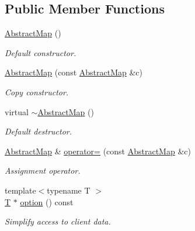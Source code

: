 \subsection*{Public Member Functions}
\begin{DoxyCompactItemize}
\item 
\hyperlink{class_d_d4hep_1_1_conditions_1_1_abstract_map_a8642c9a5024d3390bd2cb8e3c889073a}{AbstractMap} ()
\begin{DoxyCompactList}\small\item\em Default constructor. \item\end{DoxyCompactList}\item 
\hyperlink{class_d_d4hep_1_1_conditions_1_1_abstract_map_a0792cc7e113b71a15f238b363b95816d}{AbstractMap} (const \hyperlink{class_d_d4hep_1_1_conditions_1_1_abstract_map}{AbstractMap} \&c)
\begin{DoxyCompactList}\small\item\em Copy constructor. \item\end{DoxyCompactList}\item 
virtual \hyperlink{class_d_d4hep_1_1_conditions_1_1_abstract_map_ab2fbb46108e2905fb1193a67510d41f0}{$\sim$AbstractMap} ()
\begin{DoxyCompactList}\small\item\em Default destructor. \item\end{DoxyCompactList}\item 
\hyperlink{class_d_d4hep_1_1_conditions_1_1_abstract_map}{AbstractMap} \& \hyperlink{class_d_d4hep_1_1_conditions_1_1_abstract_map_a31459d63620c03e542eea7903e25ff33}{operator=} (const \hyperlink{class_d_d4hep_1_1_conditions_1_1_abstract_map}{AbstractMap} \&c)
\begin{DoxyCompactList}\small\item\em Assignment operator. \item\end{DoxyCompactList}\item 
{\footnotesize template$<$typename T $>$ }\\\hyperlink{class_t}{T} $\ast$ \hyperlink{class_d_d4hep_1_1_conditions_1_1_abstract_map_a94270429e536d39abb3ed8a204cfbc19}{option} () const 
\begin{DoxyCompactList}\small\item\em Simplify access to client data. \item\end{DoxyCompactList}\item 

\end{DoxyCompactItemize}
